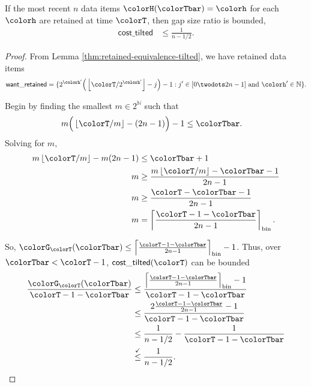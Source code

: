 \begin{lemma}
\label{thm:gap-size-ratio-tilted}
If the most recent $n$ data items $\colorH(\colorTbar) = \colorh$ for each \hv{} $\colorh$ are retained at time $\colorT$, then gap size ratio is bounded,
\begin{align*}
\mathsf{cost\_tilted}
&\leq
\frac{1}{n - 1/2}.
\end{align*}
\end{lemma}
\begin{proof}

From Lemma \ref{thm:retained-equivalence-tilted}, we have retained data items
\begin{align*}
\mathsf{want\_retained} =
\{
2^{\colorh'}\Big(\left\lfloor \colorT / 2^{\colorh'} \right\rfloor - j\Big) - 1
  :
  j' \in [0 \twodots 2n-1]
  \text{ and }
  \colorh' \in \mathbb{N}
\}.
\end{align*}

Begin by finding the smallest $m \in 2^{\mathbb{N}}$ such that
\begin{align*}
m\Big( \left\lfloor \colorT /m \right\rfloor - (2n - 1)\Big) - 1
&\leq
\colorTbar.
\end{align*}
Solving for $m$,
\begin{align*}
m \left\lfloor \colorT/m \right\rfloor - m(2n - 1)
&\leq \colorTbar + 1\\
m
&\geq \frac{
m \left\lfloor \colorT/m \right\rfloor - \colorTbar - 1
}{2n - 1}\\
m
&\geq \frac{
\colorT - \colorTbar - 1
}{2n - 1}\\
m
&= \left\lceil \frac{\colorT - 1 - \colorTbar}{2n - 1} \right\rceil_{\mathrm{bin}}.
\end{align*}

So, $\colorG_{\colorT}(\colorTbar) \leq \left\lceil \frac{\colorT - 1 - \colorTbar}{2n - 1} \right\rceil_{\mathrm{bin}} - 1$.
Thus, over $\colorTbar < \colorT - 1$, $\mathsf{cost\_tilted}(\colorT)$ can be bounded
\begin{align*}
\frac{\colorG_{\colorT}(\colorTbar)}{\colorT - 1 - \colorTbar}
&\leq
\frac{
\left\lceil \frac{\colorT - 1 - \colorTbar}{2n - 1} \right\rceil_{\mathrm{bin}} - 1
}{
\colorT - 1 - \colorTbar
}\\
&\leq
\frac{
2\frac{\colorT - 1 - \colorTbar}{2n - 1}
 - 1
}{
\colorT - 1 - \colorTbar
}\\
&\leq
\frac{1
}{n - 1/2}
-
\frac{1
}{
\colorT - 1 - \colorTbar
}\\
&\stackrel{\checkmark}{\leq}
\frac{1}{n - 1/2}.
\end{align*}

\end{proof}
